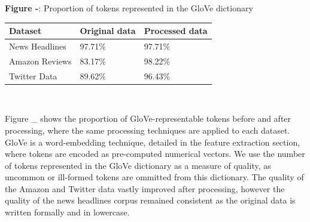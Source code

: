 \documentclass[12pt,a4paper]{article}
\begin{document}
\begin{center}
	\textbf{Figure -}:  Proportion of tokens represented in the GloVe dictionary\\
	\vspace{4pt}
	\begin{tabular}{p{3cm}||p{3cm}p{3cm}}
		\hline
		\textbf{Dataset} & \textbf{Original data} & \textbf{Processed data}\\
		\hline
		News Headlines & \hspace{20pt}97.71\% & \hspace{20pt}97.71\%\\
		\hline
		Amazon Reviews & \hspace{20pt}83.17\% & \hspace{20pt}98.22\%\\
		\hline
		Twitter Data & \hspace{20pt}89.62\% & \hspace{20pt}96.43\%\\
		\hline
	\end{tabular}\\
\end{center}

Figure \_ shows the proportion of GloVe-representable tokens before and after processing, where the same processing techniques are applied to each dataset. GloVe is a word-embedding technique, detailed in the feature extraction section, where tokens are encoded as pre-computed numerical vectors. We use the number of tokens represented in the GloVe dictionary as a measure of quality, as uncommon or ill-formed tokens are ommitted from this dictionary. The quality of the Amazon and Twitter data vastly improved after processing, however the quality of the news headlines corpus remained consistent as the original data is written formally and in lowercase.


\end{document}
